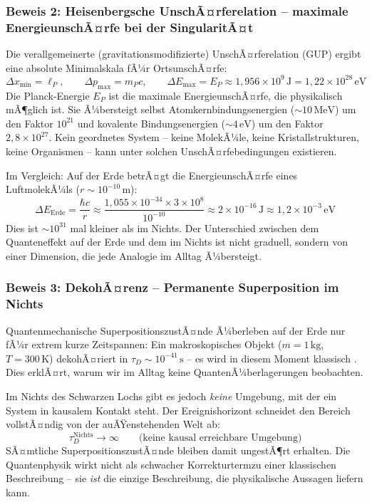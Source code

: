 ﻿\documentclass[12pt,a4paper]{report}
\begin{document}
\subsubsection{Beweis 2: Heisenbergsche UnschÃ¤rferelation -- maximale EnergieunschÃ¤rfe bei der SingularitÃ¤t}

Die verallgemeinerte (gravitationsmodifizierte) UnschÃ¤rferelation (GUP) \cite{veneziano1986,maggiore1993} ergibt eine absolute Minimalskala fÃ¼r OrtsunschÃ¤rfe:
\begin{equation*}
    \Delta x_{\min} = \ell_P, \qquad \Delta p_{\max} = m_P c, \qquad \Delta E_{\max} = E_P \approx 1{,}956 \times 10^9\,\text{J} = 1{,}22 \times 10^{28}\,\text{eV}
\end{equation*}
Die Planck-Energie $E_P$ ist die maximale EnergieunschÃ¤rfe, die physikalisch mÃ¶glich ist. Sie Ã¼bersteigt selbst Atomkernbindungsenergien ($\sim 10\,\text{MeV}$) um den Faktor $10^{21}$ und kovalente Bindungsenergien ($\sim 4\,\text{eV}$) um den Faktor $2{,}8 \times 10^{27}$. Kein geordnetes System -- keine MolekÃ¼le, keine Kristallstrukturen, keine Organismen -- kann unter solchen UnschÃ¤rfebedingungen existieren.

Im Vergleich: Auf der Erde betrÃ¤gt die EnergieunschÃ¤rfe eines LuftmolekÃ¼ls ($r \sim 10^{-10}\,\text{m}$):
\begin{equation*}
    \Delta E_{\mathrm{Erde}} = \frac{\hbar c}{r} \approx \frac{1{,}055 \times 10^{-34} \times 3 \times 10^8}{10^{-10}} \approx 2 \times 10^{-16}\,\text{J} \approx 1{,}2 \times 10^{-3}\,\text{eV}
\end{equation*}
Dies ist $\sim 10^{31}$ mal kleiner als im Nichts. Der Unterschied zwischen dem Quanteneffekt auf der Erde und dem im Nichts ist nicht graduell, sondern von einer Dimension, die jede Analogie im Alltag Ã¼bersteigt.

\subsubsection{Beweis 3: DekohÃ¤renz -- Permanente Superposition im Nichts}

Quantenmechanische SuperpositionszustÃ¤nde Ã¼berleben auf der Erde nur fÃ¼r extrem kurze Zeitspannen: Ein makroskopisches Objekt ($m = 1\,\text{kg}$, $T = 300\,\text{K}$) dekohÃ¤riert in $\tau_D \sim 10^{-41}\,\text{s}$ -- es wird in diesem Moment klassisch \cite{zurek2003}. Dies erklÃ¤rt, warum wir im Alltag keine QuantenÃ¼berlagerungen beobachten.

Im Nichts des Schwarzen Lochs gibt es jedoch \emph{keine} Umgebung, mit der ein System in kausalem Kontakt steht. Der Ereignishorizont schneidet den Bereich vollstÃ¤ndig von der auÃŸenstehenden Welt ab:
\begin{equation*}
    \tau_D^{\mathrm{Nichts}} \to \infty \qquad \text{(keine kausal erreichbare Umgebung)}
\end{equation*}
SÃ¤mtliche SuperpositionszustÃ¤nde bleiben damit ungestÃ¶rt erhalten. Die Quantenphysik wirkt nicht als schwacher Korrekturtermzu einer klassischen Beschreibung -- sie \emph{ist} die einzige Beschreibung, die physikalische Aussagen liefern kann.
\end{document}
